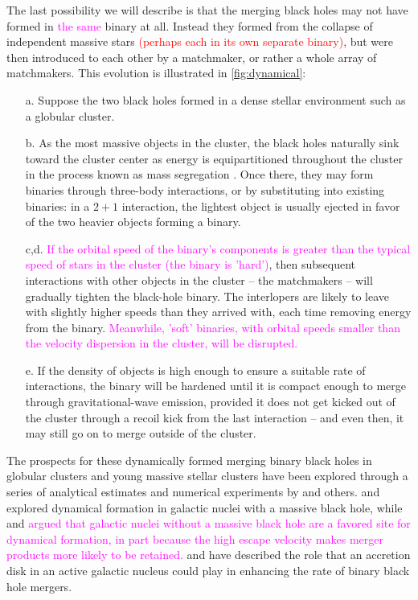 \documentclass[iop,onecolumn]{revtex4}
\newcommand{\ajf}[1]{\textcolor{red}{#1}}
\newcommand{\ilya}[1]{\textcolor{magenta}{#1}}
\begin{document}
The last possibility we will describe is that the merging black holes may not have formed in \ilya{the same} binary at all.  Instead they formed from the collapse of independent massive stars \ajf{(perhaps each in its own separate binary)}, but were then introduced to each other by a matchmaker, or rather a whole array of matchmakers.   This evolution is illustrated in \autoref{fig:dynamical}: 
\begin{enumerate}
\item[a.] Suppose the two black holes formed in a dense stellar environment such as a globular cluster.  
\item[b.] As the most massive objects in the cluster, the black holes naturally sink toward the cluster center as energy is equipartitioned throughout the cluster in the process known as mass segregation \ajf{\citep[but see][]{Trenti:2013}}.  Once there, they may form binaries through three-body interactions, or by substituting into existing binaries: in a $2+1$ interaction, the lightest object is usually ejected in favor of the two heavier objects forming a binary.  
\item[c,d.] \ilya{If the orbital speed of the binary's components is greater than the typical speed of stars in the cluster (the binary is 'hard')}, then subsequent interactions with other objects in the cluster -- the matchmakers -- will gradually tighten the black-hole binary. The interlopers are likely to leave with slightly higher speeds than they arrived with, each time removing energy from the binary.   \ilya{Meanwhile, 'soft' binaries, with orbital speeds smaller than the velocity dispersion in the cluster, will be disrupted.}
\item[e.] If the density of objects is high enough to ensure a suitable rate of interactions, the binary will be hardened until it is compact enough to merge through gravitational-wave emission, provided it does not get kicked out of the cluster through a recoil kick from the last interaction -- and even then, it may still go on to merge outside of the cluster.  
\end{enumerate}

The prospects for these dynamically formed merging binary black holes in globular clusters and young massive stellar clusters have been explored through a series of analytical estimates and numerical experiments by \citet{Sigurdsson:1993,Kulkarni:1993,PZwart:2000,OLeary:2006,Banerjee:2010,Downing:2011,Morscher:2015,Mapelli:2016,Rodriguez:2016} and others.  \citet{OLeary:2008} \citep[but see][]{Tsang:2013} and \ilya{\citet{AntoniniPerets:2012}} explored dynamical formation in galactic nuclei with a massive black hole, while \citet{MillerLauburg:2008} and \ilya{\citet{AntoniniRasio:2016} argued that galactic nuclei without a massive black hole are a favored site for dynamical formation, in part because the high escape velocity makes merger products more likely to be retained.}  \citet{Bartos:2016} and \citet{Stone:2016} have described the role that an accretion disk in an active galactic nucleus could play in enhancing the rate of binary black hole mergers.
\end{document}
